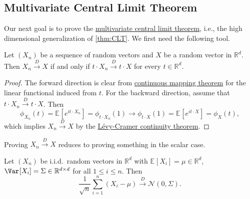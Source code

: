 \subsection{Multivariate Central Limit Theorem}
Our next goal is to prove the \hyperref[thm:multivariate-CLT]{multivariate central limit theorem}, i.e., the high dimensional generalization of \autoref{thm:CLT}. We first need the following tool.

\begin{theorem}\label{thm:Cramer-Wold-device}
	Let \((X_n)\) be a sequence of random vectors and \(X\) be a random vector in \(\mathbb{R} ^d\). Then \(X_n \overset{D}{\to} X\) if and only if \(t \cdot X_n \overset{D}{\to} t \cdot X\) for every \(t \in \mathbb{R} ^d\).
\end{theorem}
\begin{proof}
	The forward direction is clear from \hyperref[thm:continuous-mapping]{continuous mapping theorem} for the linear functional induced from \(t\). For the backward direction, assume that \(t \cdot X_n \overset{D}{\to} t \cdot X\). Then
	\[
		\phi _{X_n}(t)
		= \mathbb{E}_{}[e^{i t \cdot X_n}]
		= \phi _{t \cdot X_n}(1)
		\to \phi _{t \cdot X}(1)
		= \mathbb{E}_{}[e^{i t \cdot X}]
		= \phi _X(t),
	\]
	which implies \(X_n \overset{D}{\to} X\) by the \hyperref[thm:Levy-Cramer-continuity]{Lévy-Cramer continuity theorem}.
\end{proof}

\begin{remark}
	Proving \(X_n \overset{D}{\to} X\) reduces to proving something in the scalar case.
\end{remark}

\begin{theorem}\label{thm:multivariate-CLT}
	Let \((X_n)\) be i.i.d.\ random vectors in \(\mathbb{R} ^d\) with \(\mathbb{E}_{}[X_i] = \mu \in \mathbb{R} ^d\), \(\Var_{}[X_i] = \Sigma \in \mathbb{R} ^{d \times d}\) for all \(1 \leq i \leq n\). Then
	\[
		\frac{1}{\sqrt{n} } \sum_{i=1}^{n} (X_i - \mu )
		\overset{D}{\to} \mathcal{N} (0, \Sigma ).
	\]
\end{theorem}
